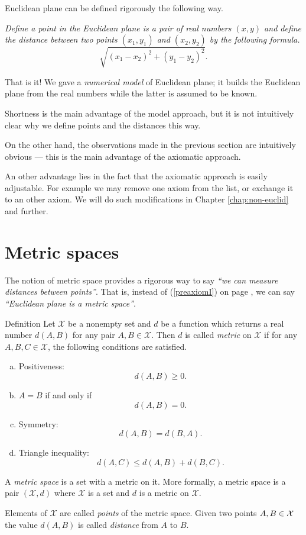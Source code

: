 Euclidean plane can be defined rigorously the following way.

{}\emph{Define a {}\emph{point} in the Euclidean plane is a pair of real numbers $(x,y)$ and define the {}\emph{distance} between two points $(x_1,y_1)$ and $(x_2,y_2)$ by the following formula.}
\[\sqrt{(x_1-x_2)^2+(y_1-y_2)^2}.\]

That is it!
We gave a {}\emph{numerical model} of Euclidean plane;
it builds the Euclidean plane from the real numbers
while the latter is assumed to be known.

Shortness is the main advantage of the model approach,
but it is not intuitively clear why we define points and the distances this way.

On the other hand, the observations made in the previous section are  intuitively obvious ---
this is the main advantage of the axiomatic approach.

An other advantage lies in the fact that the axiomatic approach is easily adjustable. 
For example we may remove one axiom from the list,
or exchange it to an other axiom. 
We will do such modifications in Chapter \ref{chap:non-euclid} and further.

\section*{Metric spaces}

The notion of metric space provides 
a rigorous way to say {}\emph{``we can measure distances between points''}.
That is, instead of (\ref{preaxiomI}) on page \pageref{preaxiomI},
we can say {}\emph{``Euclidean plane is a metric space''}.

\begin{thm}{Definition}\label{def:metric-space}
Let $\mathcal X$ be a nonempty set and 
$d$ be a function
which returns a real number $d(A,B)$
for any pair $A,B\in\mathcal X$.
Then $d$
is called \emph{metric} on 
$\mathcal X$ if for any
$A,B,C\in \mathcal X$, the following conditions are satisfied.
\begin{enumerate}[(a)]
\item\label{def:metric-space:a} Positiveness: 
$$d(A,B)\ge 0.$$
\item\label{def:metric-space:b}  $A=B$ if and only if 
$$d(A,B)=0.$$
\item\label{def:metric-space:c} Symmetry: $$d(A, B) = d(B, A).$$
\item\label{def:metric-space:d} Triangle inequality: 
$$d(A, C) \le d(A, B) + d(B, C).$$
\end{enumerate}
A \emph{metric space} is a set with a metric on it. 
More formally, a metric space is a pair $(\mathcal X, d)$ where $\mathcal X$ is a set and $d$ is a metric on $\mathcal X$.

Elements of $\mathcal X$ are called \emph{points} of the metric space.
Given two points $A,B\z\in \mathcal X$ the value
$d(A, B)$ is called \emph{distance} from $A$ to $B$.
\end{thm}


